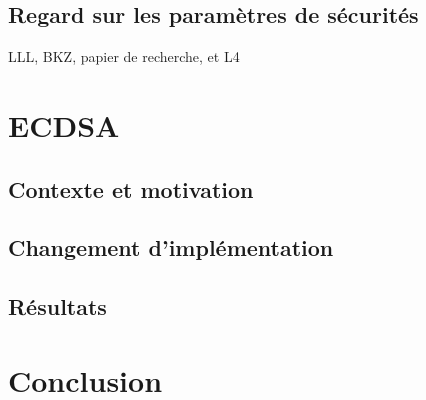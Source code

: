\documentclass{backend}
\begin{document}
\subsection{Regard sur les paramètres de sécurités}

%
%

LLL, BKZ, papier de recherche, et L4

\section{ECDSA}

\subsection{Contexte et motivation}

\subsection{Changement d'implémentation}

\subsection{Résultats}


%
%

\section{Conclusion}

\newpage
\end{document}
